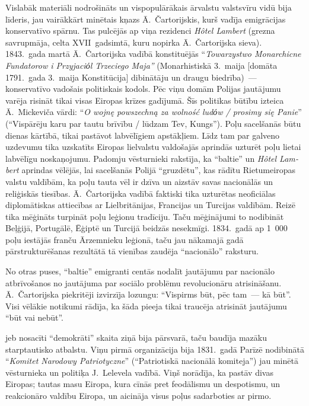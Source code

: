 \documentclass[twoside,a5paper,12pt,fleqn,openany]{extbook}
\newcommand{\pltxti}[1]{\textit{\textpolish{#1}}}
\newcommand{\frtxti}[1]{\textit{\textfrench{#1}}}
\begin{document}
Vislabāk materiāli nodrošināts un vispopulārākais ārvalstu valstsvīru vidū bija  līderis, jau vairākkārt minētais kņazs Ā.~Čartorijskis, kurš vadīja emigrācijas konservatīvo spārnu. Tas pulcējās ap viņa rezidenci \frtxti{Hôtel Lambert} (grezna savrupmāja, celta XVII~gadsimtā, kuru nopirka Ā.~Čartorijska sieva). 1843.~gada martā Ā.~Čartorijska vadībā konstituējās ``\pltxti{Towarzystwo Monarchicne Fundatorow i Przyjaciόl Trzeciego Maja''} (Monarhistiskā 3.~maija [domāta 1791.~gada 3.~maija Konstitūcija] dibinātāju un draugu biedrība)~--- konservatīvo vadošais politiskais kodols. Pēc viņu domām Polijas jautājumu varēja risināt tikai visas Eiropas krīzes gadījumā. Šīs politikas būtību izteica Ā.~Mickeviča vārdi: ``\pltxti{O wojnę powszechną za wolność ludόw / prosimy się Panie}'' (``Vispārēju karu par tautu brīvību / lūdzam Tev, Kungs''). Poļu sacelšanās būtu dienas kārtībā, tikai pastāvot labvēlīgiem apstākļiem. Līdz tam par galveno uzdevumu tika uzskatīts Eiropas lielvalstu valdošajās aprindās uzturēt poļu lietai labvēlīgu noskaņojumu. Padomju vēsturnieki rakstīja, ka ``baltie'' un \frtxti{Hôtel Lambert} aprindas vēlējās, lai sacelšanās Polijā ``gruzdētu'', kas rādītu Rietumeiropas valstu valdībām, ka poļu tauta vēl ir dzīva un aizstāv savas nacionālās un reliģiskās tiesības. Ā.~Čartorijska vadībā faktiski tika uzturētas neoficiālas diplomātiskas attiecības ar Lielbritānijas, Francijas un Turcijas valdībām. Reizē tika mēģināts turpināt poļu leģionu tradīciju. Taču mēģinājumi to nodibināt Beļģijā, Portugālē, Ēģiptē un Turcijā beidzās nesekmīgi. 1834.~gadā ap 1~000 poļu iestājās franču Ārzemnieku leģionā, taču jau nākamajā gadā pārstrukturēšanas rezultātā tā vienības zaudēja ``nacionālo'' raksturu.

No otras puses, ``baltie'' emigranti centās nodalīt jautājumu par nacionālo atbrīvošanos no jautājuma par sociālo problēmu revolucionāru atrisināšanu. Ā.~Čartorijska piekritēji izvirzīja lozungu: ``Vispirms būt, pēc tam~--- kā būt''. Visi vēlākie notikumi rādīja, ka šāda pieeja tikai traucēja atrisināt jautājumu ``būt vai nebūt''.

 jeb nosacīti ``demokrāti'' skaita ziņā bija pārsvarā, taču baudīja mazāku starptautisko atbalstu. Viņu pirmā organizācija bija 1831.~gadā Parīzē nodibinātā ``\pltxti{Komitet Narodowy Patriotyczne}'' (``Patriotiskā nacionālā komiteja'') jau minētā vēsturnieka un politiķa J.~Lelevela vadībā. Viņš norādīja, ka pastāv divas Eiropas; tautas masu Eiropa, kura cīnās pret feodālismu un despotismu, un reakcionāro valdību Eiropa, un aicināja visus poļus sadarboties ar pirmo.
\end{document}
